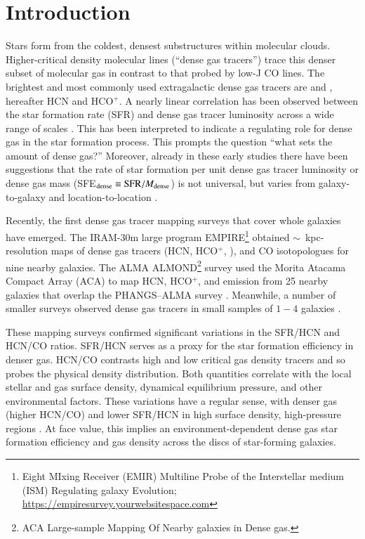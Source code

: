 \documentclass[letter, longauth]{aa} %
\begin{document}
\section{Introduction}

Stars form from the coldest, densest substructures within molecular clouds. 
Higher-critical density molecular lines (``dense gas tracers'') trace this denser subset of molecular gas in contrast to that probed by low-J CO lines.
The brightest and most commonly used extragalactic dense gas tracers are \hcnone and \hcopone, hereafter HCN and HCO$^+$. A nearly linear correlation has been observed between the star formation rate (SFR) and dense gas tracer luminosity across a wide range of scales \citep[e.g.,][]{Gao2004, Wu2010, Garcia-Burillo2012, Usero2015, Chen2017}. This has been interpreted to indicate a regulating role for dense gas in the star formation process. This prompts the question ``what sets the amount of dense gas?'' Moreover, already in these early studies there have been suggestions that the rate of star formation per unit dense gas tracer luminosity or dense gas mass (SFE$_{\rm dense} \equiv {\rm SFR}/M_{\rm dense}$) is not universal, but varies from galaxy-to-galaxy and location-to-location \citep[][]{Garcia-Burillo2012, Usero2015, Chen2015}.

Recently, the first dense gas tracer mapping surveys that cover whole galaxies have emerged. The IRAM-30m large program EMPIRE\footnote{Eight MIxing Receiver (EMIR) Multiline Probe of the Interstellar medium (ISM) Regulating galaxy Evolution; \url{https://empiresurvey.yourwebsitespace.com}} \citep[][]{Bigiel2016, Jimenez-Donaire2017, Jimenez-Donaire2019} obtained $\sim$~kpc-resolution maps of dense gas tracers (HCN, HCO$^+$, \hncone), and CO isotopologues for nine nearby galaxies. The ALMA ALMOND\footnote{ACA Large-sample Mapping Of Nearby galaxies in Dense gas.} survey \citep{Neumann2023a} used the Morita Atacama Compact Array (ACA) to map HCN, HCO$^+$, and \cstwo emission from 25 nearby galaxies that overlap the PHANGS--ALMA  \cotwo survey \citep{Leroy2021a}. 
Meanwhile, a number of smaller surveys observed dense gas tracers in small samples of $1{-}4$ galaxies \citep[e.g.][]{Tan2018, Gallagher2018a, Gallagher2018b, Querejeta2019, Beslic2021, Heyer2022, Neumann2024, Lin2024}. 

These mapping surveys confirmed significant variations in the SFR/HCN and HCN/CO ratios.
SFR/HCN serves as a proxy for the star formation efficiency in denser gas.
HCN/CO contrasts high and low critical gas density tracers and so probes the physical density distribution. 
Both quantities correlate with the local stellar and gas surface density, dynamical equilibrium pressure, and other environmental factors. 
These variations have a regular sense, with denser gas (higher HCN/CO) and lower SFR/HCN in high surface density, high-pressure regions \citep[e.g.][]{Jimenez-Donaire2019}.  
At face value, this implies an environment-dependent dense gas star formation efficiency and gas density across the discs of star-forming galaxies.
\end{document}
